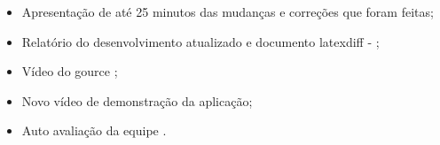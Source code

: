 \begin{itemize}

    \item Apresentação de até 25 minutos das mudanças e correções que foram feitas;
    
    \item Relatório do desenvolvimento  atualizado e documento \gls{latexdiff} - ;

    \item Vídeo do \gls{gource} ;
    
    \item Novo vídeo de demonstração da aplicação;

    \item Auto avaliação da equipe .
    
\end{itemize}
